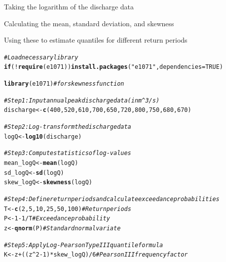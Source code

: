 \documentclass{tufte-handout}\usepackage[]{graphicx}\usepackage[]{xcolor}
\makeatletter
\newcommand{\hlnum}[1]{\textcolor[rgb]{0.686,0.059,0.569}{#1}}%
\newcommand{\hlstr}[1]{\textcolor[rgb]{0.192,0.494,0.8}{#1}}%
\newcommand{\hlcom}[1]{\textcolor[rgb]{0.678,0.584,0.686}{\textit{#1}}}%
\newcommand{\hlopt}[1]{\textcolor[rgb]{0,0,0}{#1}}%
\newcommand{\hlstd}[1]{\textcolor[rgb]{0.345,0.345,0.345}{#1}}%
\newcommand{\hlkwa}[1]{\textcolor[rgb]{0.161,0.373,0.58}{\textbf{#1}}}%
\newcommand{\hlkwb}[1]{\textcolor[rgb]{0.69,0.353,0.396}{#1}}%
\newcommand{\hlkwc}[1]{\textcolor[rgb]{0.333,0.667,0.333}{#1}}%
\newcommand{\hlkwd}[1]{\textcolor[rgb]{0.737,0.353,0.396}{\textbf{#1}}}%
\newenvironment{kframe}{%
 \def\at@end@of@kframe{}%
 \ifinner\ifhmode%
  \def\at@end@of@kframe{\end{minipage}}%
  \begin{minipage}{\columnwidth}%
 \fi\fi%
 \def\FrameCommand##1{\hskip\@totalleftmargin \hskip-\fboxsep
 \colorbox{shadecolor}{##1}\hskip-\fboxsep
     \hskip-\linewidth \hskip-\@totalleftmargin \hskip\columnwidth}%
 \MakeFramed {\advance\hsize-\width
   \@totalleftmargin\z@ \linewidth\hsize
   \@setminipage}}%
 {\par\unskip\endMakeFramed%
 \at@end@of@kframe}
\newenvironment{knitrout}{}{} %
\newenvironment{itemize*}%
  {\begin{itemize}%
    \setlength{\itemsep}{0pt}%
    \setlength{\parskip}{0pt}}%
  {\end{itemize}}
\makeatother
\begin{document}
\begin{itemize*}
  \item Taking the logarithm of the discharge data
  \item Calculating the mean, standard deviation, and skewness
  \item Using these to estimate quantiles for different return periods
\end{itemize*}

\begin{knitrout}
\color{fgcolor}\begin{kframe}
\begin{alltt}
\hlcom{# Load necessary library}
\hlkwa{if} \hlstd{(}\hlopt{!}\hlkwd{require}\hlstd{(e1071))} \hlkwd{install.packages}\hlstd{(}\hlstr{"e1071"}\hlstd{,} \hlkwc{dependencies} \hlstd{=} \hlnum{TRUE}\hlstd{)}
\end{alltt}


{\ttfamily\noindent\itshape\color{messagecolor}{\#\# Loading required package: e1071}}\begin{alltt}
\hlkwd{library}\hlstd{(e1071)}  \hlcom{# for skewness function}

\hlcom{# Step 1: Input annual peak discharge data (in m^3/s)}
\hlstd{discharge} \hlkwb{<-} \hlkwd{c}\hlstd{(}\hlnum{400}\hlstd{,} \hlnum{520}\hlstd{,} \hlnum{610}\hlstd{,} \hlnum{700}\hlstd{,} \hlnum{650}\hlstd{,} \hlnum{720}\hlstd{,} \hlnum{800}\hlstd{,} \hlnum{750}\hlstd{,} \hlnum{680}\hlstd{,} \hlnum{670}\hlstd{)}

\hlcom{# Step 2: Log-transform the discharge data}
\hlstd{logQ} \hlkwb{<-} \hlkwd{log10}\hlstd{(discharge)}

\hlcom{# Step 3: Compute statistics of log-values}
\hlstd{mean_logQ} \hlkwb{<-} \hlkwd{mean}\hlstd{(logQ)}
\hlstd{sd_logQ}   \hlkwb{<-} \hlkwd{sd}\hlstd{(logQ)}
\hlstd{skew_logQ} \hlkwb{<-} \hlkwd{skewness}\hlstd{(logQ)}

\hlcom{# Step 4: Define return periods and calculate exceedance probabilities}
\hlstd{T} \hlkwb{<-} \hlkwd{c}\hlstd{(}\hlnum{2}\hlstd{,} \hlnum{5}\hlstd{,} \hlnum{10}\hlstd{,} \hlnum{25}\hlstd{,} \hlnum{50}\hlstd{,} \hlnum{100}\hlstd{)}              \hlcom{# Return periods}
\hlstd{P} \hlkwb{<-} \hlnum{1} \hlopt{-} \hlnum{1} \hlopt{/} \hlstd{T}                             \hlcom{# Exceedance probability}
\hlstd{z} \hlkwb{<-} \hlkwd{qnorm}\hlstd{(P)}                              \hlcom{# Standard normal variate}

\hlcom{# Step 5: Apply Log-Pearson Type III quantile formula}
\hlstd{K} \hlkwb{<-} \hlstd{z} \hlopt{+} \hlstd{( (z}\hlopt{^}\hlnum{2} \hlopt{-} \hlnum{1}\hlstd{)} \hlopt{*} \hlstd{skew_logQ )} \hlopt{/} \hlnum{6}    \hlcom{# Pearson III frequency factor}


\end{alltt}
\end{kframe}
\end{knitrout}
\end{document}
